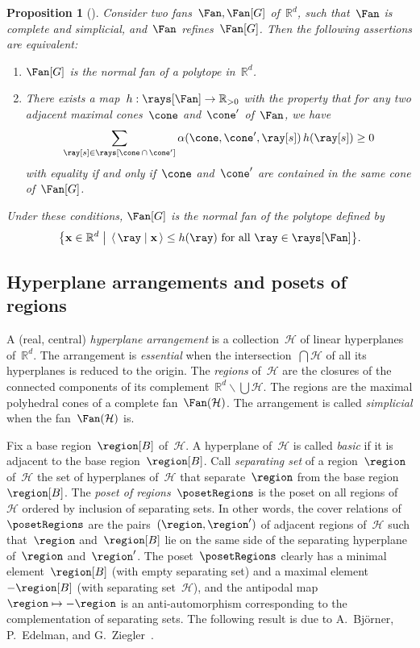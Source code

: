 \documentclass{amsart}
\newtheorem{proposition}[theorem]{Proposition}
\theoremstyle{definition}
\newcommand{\R}{\mathbb{R}} %
\renewcommand{\b}[1]{\mathbf{#1}} %
\newcommand{\bigset}[2]{\big\{ #1 \;\big|\; #2 \big\}} %
\newcommand{\ssm}{\smallsetminus} %
\newcommand{\dotprod}[2]{\left\langle \, #1 \; \middle| \; #2 \, \right\rangle} %
\newcommand{\darkblue}{\color{darkblue}} %
\newcommand{\defn}[1]{\textsl{\darkblue #1}} %
\newcommand{\arrangement}{\mathcal{H}} %
\newcommand{\coefficient}{\alpha} %
\begin{document}
\begin{proposition}[{\cite[Prop.~3]{PilaudSantos-quotientopes}}]
\label{prop:polytopalSubfanFan}
Consider two fans~$\Fan, \Fan[G]$ of~$\R^d$, such that~$\Fan$ is complete and simplicial, and~$\Fan$ refines~$\Fan[G]$.
Then the following assertions are equivalent:
\begin{enumerate}
\item $\Fan[G]$ is the normal fan of a polytope in~$\R^d$.
\item There exists a map~$h: \rays[\Fan] \to \R_{> 0}$ with the property that for any two adjacent maximal cones~$\cone$ and~$\cone'$ of~$\Fan$, we have
\[
\sum_{\ray[s] \in \rays[\cone \,\cap\, \cone']} \coefficient(\cone, \cone', \ray[s]) \, h(\ray[s]) \ge 0
\]
with equality if and only if~$\cone$ and~$\cone'$ are contained in the same cone of~$\Fan[G]$.
\end{enumerate}
Under these conditions, $\Fan[G]$ is the normal fan of the polytope defined by
\[
\bigset{\b{x} \in \R^d}{\dotprod{\ray}{\b{x}} \le h(\ray) \text{ for all } \ray \in \rays[\Fan]}.
\]
\end{proposition}

\subsection{Hyperplane arrangements and posets of regions}
\label{subsec:posetRegions}

A (real, central) \defn{hyperplane arrangement} is a collection~$\arrangement$ of linear hyperplanes of~$\R^d$.
The arrangement is \defn{essential} when the intersection~$\bigcap \arrangement$ of all its hyperplanes is reduced to the origin.
The \defn{regions} of~$\arrangement$ are the closures of the connected components of its complement~$\R^d \ssm \bigcup \arrangement$.
The regions are the maximal polyhedral cones of a complete fan~$\Fan(\arrangement)$.
The arrangement is called \defn{simplicial} when the fan~$\Fan(\arrangement)$ is.

Fix a base region~$\region[B]$ of~$\arrangement$.
A hyperplane of~$\arrangement$ is called \defn{basic} if it is adjacent to the base region~$\region[B]$.
Call \defn{separating set} of a region~$\region$ of~$\arrangement$ the set of hyperplanes of~$\arrangement$ that separate~$\region$ from the base region~$\region[B]$.
The \defn{poset of regions}~$\posetRegions$ is the poset on all regions of~$\arrangement$ ordered by inclusion of separating sets.
In other words, the cover relations of~$\posetRegions$ are the pairs~$(\region, \region')$ of adjacent regions of~$\arrangement$ such that~$\region$ and~$\region[B]$ lie on the same side of the separating hyperplane of~$\region$ and~$\region'$.
The poset~$\posetRegions$ clearly has a minimal element~$\region[B]$ (with empty separating set) and a maximal element~$-\region[B]$ (with separating set~$\arrangement$), and the antipodal map~$\region \mapsto -\region$ is an anti-automorphism corresponding to the complementation of separating sets.
The following result is due to A.~Bj\"orner, P.~Edelman, and G.~Ziegler~\cite{BjornerEdelmanZiegler}.
\end{document}
